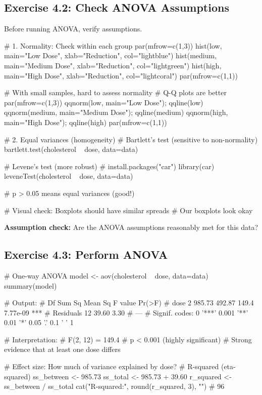 \documentclass[11pt]{article}
\begin{document}
\newpage

\subsection{Exercise 4.2: Check ANOVA Assumptions}

Before running ANOVA, verify assumptions.

\begin{rcode}
# 1. Normality: Check within each group
par(mfrow=c(1,3))
hist(low, main="Low Dose", xlab="Reduction", col="lightblue")
hist(medium, main="Medium Dose", xlab="Reduction", col="lightgreen")
hist(high, main="High Dose", xlab="Reduction", col="lightcoral")
par(mfrow=c(1,1))

# With small samples, hard to assess normality
# Q-Q plots are better
par(mfrow=c(1,3))
qqnorm(low, main="Low Dose"); qqline(low)
qqnorm(medium, main="Medium Dose"); qqline(medium)
qqnorm(high, main="High Dose"); qqline(high)
par(mfrow=c(1,1))

# 2. Equal variances (homogeneity)
# Bartlett's test (sensitive to non-normality)
bartlett.test(cholesterol ~ dose, data=data)

# Levene's test (more robust)
# install.packages("car")
library(car)
leveneTest(cholesterol ~ dose, data=data)

# p > 0.05 means equal variances (good!)

# Visual check: Boxplots should have similar spreads
# Our boxplots look okay
\end{rcode}

\textbf{Assumption check:} Are the ANOVA assumptions reasonably met for this data?

\vspace{2cm}

\subsection{Exercise 4.3: Perform ANOVA}

\begin{rcode}
# One-way ANOVA
model <- aov(cholesterol ~ dose, data=data)
summary(model)

# Output:
#             Df Sum Sq Mean Sq F value   Pr(>F)
# dose         2 985.73  492.87   149.4 7.77e-09 ***
# Residuals   12  39.60    3.30
# ---
# Signif. codes:  0 '***' 0.001 '**' 0.01 '*' 0.05 '.' 0.1 ' ' 1

# Interpretation:
# F(2, 12) = 149.4
# p < 0.001 (highly significant)
# Strong evidence that at least one dose differs

# Effect size: How much of variance explained by dose?
# R-squared (eta-squared)
ss_between <- 985.73
ss_total <- 985.73 + 39.60
r_squared <- ss_between / ss_total
cat("R-squared:", round(r_squared, 3), "\n")
# 96%
\end{rcode}
\end{document}
